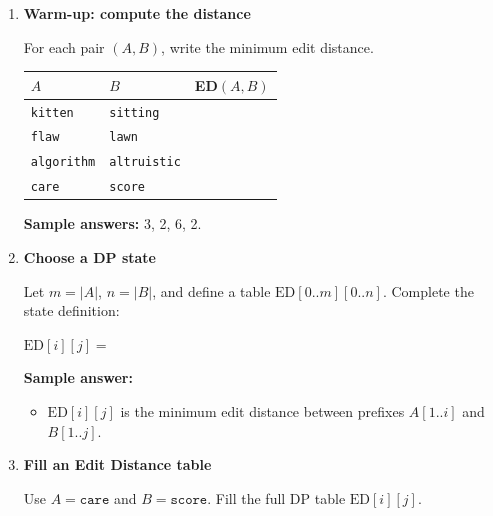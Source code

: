 \documentclass[11pt]{article}
\begin{document}
\begin{enumerate}[leftmargin=0pt, itemindent=1.7em, itemsep=1.2em]

\item \textbf{Warm-up: compute the distance}

For each pair $(A,B)$, write the minimum edit distance.

\vspace{0.2cm}
\begin{center}
\renewcommand{\arraystretch}{1.5}
\begin{tabular}{|>{\raggedright\arraybackslash}m{2.3in}|>{\raggedright\arraybackslash}m{2.3in}|>{\centering\arraybackslash}m{0.8in}|}
\hline
$A$ & $B$ & ED$(A,B)$ \\\hline
\texttt{kitten} & \texttt{sitting} & \\\hline
\texttt{flaw} & \texttt{lawn} & \\\hline
\texttt{algorithm} & \texttt{altruistic} & \\\hline
\texttt{care} & \texttt{score} & \\\hline
\end{tabular}
\end{center}

\vspace{0.8cm}

\ifanswers
\textbf{Sample answers:} 3, 2, 6, 2.
\fi

\item \textbf{Choose a DP state}

Let $m=|A|$, $n=|B|$, and define a table $\mathrm{ED}[0..m][0..n]$.
Complete the state definition:

\vspace{0.2cm}
\hspace*{1em}$\mathrm{ED}[i][j] =$ \hrulefill

\vspace{2.0cm}

\ifanswers
\textbf{Sample answer:}
\begin{itemize}
    \item $\mathrm{ED}[i][j]$ is the minimum edit distance between prefixes $A[1..i]$ and $B[1..j]$.
\end{itemize}
\fi

\item \textbf{Fill an Edit Distance table}

Use $A=\texttt{care}$ and $B=\texttt{score}$. Fill the full DP table $\mathrm{ED}[i][j]$.


\end{enumerate}
\end{document}
